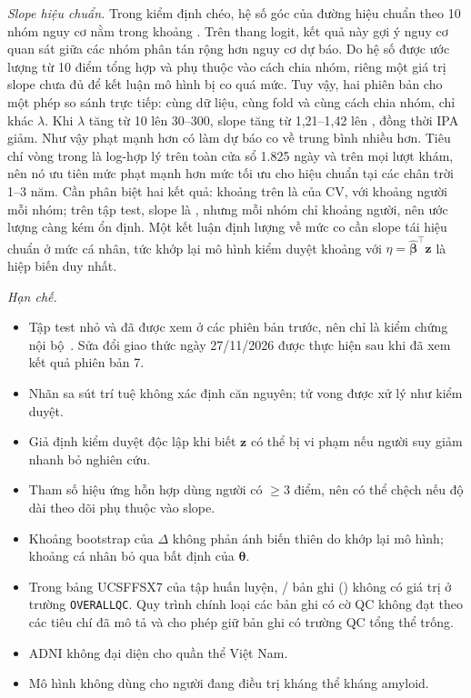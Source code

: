 \documentclass[journal]{IEEEtran}
\newcommand{\code}[1]{\texttt{#1}}
\begin{document}
\emph{Slope hiệu chuẩn.} Trong kiểm định chéo, hệ số góc của đường hiệu chuẩn theo 10 nhóm nguy cơ nằm trong khoảng . Trên thang logit, kết quả này gợi ý nguy cơ quan sát giữa các nhóm phân tán rộng hơn nguy cơ dự báo. Do hệ số được ước lượng từ 10 điểm tổng hợp và phụ thuộc vào cách chia nhóm, riêng một giá trị slope chưa đủ để kết luận mô hình bị co quá mức. Tuy vậy, hai phiên bản cho một phép so sánh trực tiếp: cùng dữ liệu, cùng fold và cùng cách chia nhóm, chỉ khác $\lambda$. Khi $\lambda$ tăng từ 10 lên 30--300, slope tăng từ 1,21--1,42 lên , đồng thời IPA giảm. Như vậy phạt mạnh hơn có làm dự báo co về trung bình nhiều hơn. Tiêu chí vòng trong là log-hợp lý trên toàn cửa sổ 1.825 ngày và trên mọi lượt khám, nên nó ưu tiên mức phạt mạnh hơn mức tối ưu cho hiệu chuẩn tại các chân trời 1--3 năm. Cần phân biệt hai kết quả: khoảng trên là của CV, với khoảng  người mỗi nhóm; trên tập test, slope là , nhưng mỗi nhóm chỉ khoảng  người, nên ước lượng càng kém ổn định. Một kết luận định lượng về mức co cần slope tái hiệu chuẩn ở mức cá nhân, tức khớp lại mô hình kiểm duyệt khoảng với $\hat\eta=\hat{\bm\beta}^\top\bm z$ là hiệp biến duy nhất.

\emph{Hạn chế.}
\begin{itemize}
\item Tập test nhỏ và đã được xem ở các phiên bản trước, nên chỉ là kiểm chứng nội bộ~\cite{riley2022}. Sửa đổi giao thức ngày 27/11/2026 được thực hiện sau khi đã xem kết quả phiên bản 7.
\item Nhãn sa sút trí tuệ không xác định căn nguyên; tử vong được xử lý như kiểm duyệt.
\item Giả định kiểm duyệt độc lập khi biết $\bm z$ có thể bị vi phạm nếu người suy giảm nhanh bỏ nghiên cứu.
\item Tham số hiệu ứng hỗn hợp dùng người có $\ge3$ điểm, nên có thể chệch nếu độ dài theo dõi phụ thuộc vào slope.
\item Khoảng bootstrap của $\Delta$ không phản ánh biến thiên do khớp lại mô hình; khoảng cá nhân bỏ qua bất định của $\bm\theta$.
\item Trong bảng UCSFFSX7 của tập huấn luyện, / bản ghi () không có giá trị ở trường \code{OVERALLQC}. Quy trình chính loại các bản ghi có cờ QC không đạt theo các tiêu chí đã mô tả và cho phép giữ bản ghi có trường QC tổng thể trống.
\item ADNI không đại diện cho quần thể Việt Nam.
\item Mô hình không dùng cho người đang điều trị kháng thể kháng amyloid.
\end{itemize}
\end{document}
